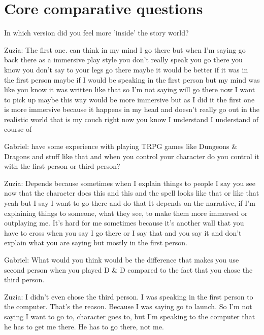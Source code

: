 \section{Core comparative questions}

\begin{QandA}
   \item In which version did you feel more 'inside' the story world?
         \begin{answered}
            Zuzia: The first one.
            can think in my mind I go there but when I'm saying go back there as a immersive play style you don't really speak you go there you know you don't say to your legs go there maybe it would be better if it was in the first person maybe if I would be speaking in the first person but my mind was like you know it was written like that so I'm not saying
            will go there now I want to pick up maybe this way would be more immersive but as I did it the first one is more immersive because it happens in my head and doesn't really go out in the realistic world that is my couch right now you know I understand I understand of course of


            Gabriel: have some experience with playing TRPG games like Dungeons \& Dragons and stuff like that and when you control your character do you control it with the first person or third person?


            Zuzia: Depends because sometimes when I explain things to people I say you see now that the character does this and this and the spell looks like that or like that yeah but I say I want to go there and do that
            It depends on the narrative, if I'm explaining things to someone, what they see, to make them more immersed or outplaying me.
            It's hard for me sometimes because it's another wall that you have to cross when you say I go there or I say that and you say it and don't explain what you are saying but mostly in the first person.


            Gabriel: What would you think would be the difference that makes you use second person when you played D \& D compared to the fact that you chose the third person.


            Zuzia: I didn't even chose the third person.
            I was speaking in the first person to the computer.
            That's the reason.
            Because I was saying go to launch.
            So I'm not saying I want to go to, character goes to, but I'm speaking to the computer that he has to get me there.
            He has to go there, not me.



\end{answered}
\end{QandA}
